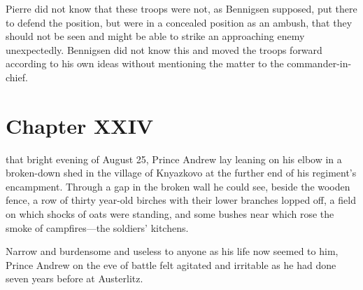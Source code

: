 Pierre did not know that these troops were not, as Bennigsen
supposed, put there to defend the position, but were in a
concealed position as an ambush, that they should not be seen and
might be able to strike an approaching enemy
unexpectedly. Bennigsen did not know this and moved the troops
forward according to his own ideas without mentioning the matter
to the commander-in-chief.


\chapter*{Chapter XXIV} \ifaudio {}
\fi

 that bright evening of August 25, Prince Andrew lay leaning on
his elbow in a broken-down shed in the village of Knyazkovo at
the further end of his regiment's encampment. Through a gap in
the broken wall he could see, beside the wooden fence, a row of
thirty year-old birches with their lower branches lopped off, a
field on which shocks of oats were standing, and some bushes near
which rose the smoke of campfires---the soldiers' kitchens.

Narrow and burdensome and useless to anyone as his life now
seemed to him, Prince Andrew on the eve of battle felt agitated
and irritable as he had done seven years before at Austerlitz.

